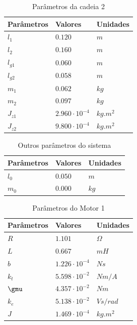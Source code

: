 \documentclass[]{politex}
\begin{document}
\begin{table}[H] 
\centering
\caption{Parâmetros da cadeia 2}
\label{parametrosCadeia1}
\begin{tabular}{l|l|l}
Parâmetros   & Valores                    & Unidades   \\ \hline
$l_1$        & $0.120$                    & $m$        \\
$l_2$        & $0.160$                    & $m$        \\
$l_{g1}$     & $0.060$                    & $m$        \\
$l_{g2}$     & $0.058$                    & $m$        \\
$m_1$        & $0.062$                    & $kg$       \\
$m_2$        & $0.097$                    & $kg$       \\
$J_{z1}$     & $2.960   \cdot 10^{-4}$    & $kg.m^{2}$ \\
$J_{z2}$     & $9.800   \cdot 10^{-4}$    & $kg.m^{2}$ \\
\end{tabular}
\end{table}

\begin{table}[H] 
\centering
\caption{Outros parâmetros do sistema}
\label{parametrosCadeia1}
\begin{tabular}{l|l|l}
Parâmetros   & Valores                  & Unidades   \\ \hline
$l_0$        & $0.050$                     & $m$     \\
$m_0$        & $0.000$                     & $kg$     \\
\end{tabular}
\end{table}  

\begin{table}[H] 
\centering
\caption{Parâmetros do Motor 1}
\label{parametrosMotor}
\begin{tabular}{l|l|l}
Parâmetros  & Valores               & Unidades   \\ \hline
$R$         & $1.101$               & $\Omega$   \\
$L$         & $0.667$               & $mH$       \\
$b$         & $1.226 \cdot 10^{-4}$ & $N s$      \\
$k_{t}$     & $5.598 \cdot 10^{-2}$ & $Nm/A$     \\
$\gmu$      & $4.357 \cdot 10^{-2}$ & $Nm$       \\
$k_{e}$     & $5.138 \cdot 10^{-2}$ & $V s/rad$  \\
$J$         & $1.469 \cdot 10^{-4}$ & $kg.m^{2}$
\end{tabular}
\end{table} 
\end{document}
